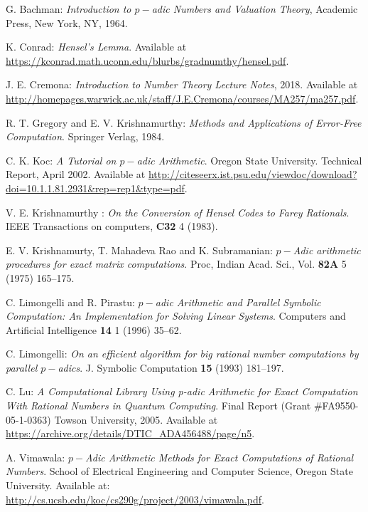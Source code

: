 \documentclass[fleqn]{cas-sc}
\begin{document}
%
\begin{thebibliography}{99}
 G. Bachman: \emph{Introduction to $p-$adic Numbers and Valuation Theory}, 
Academic Press, New York, NY, 1964.

 K. Conrad: \emph{Hensel's Lemma}. Available at
\url{https://kconrad.math.uconn.edu/blurbs/gradnumthy/hensel.pdf}.

 J. E. Cremona: \emph{Introduction to Number Theory Lecture Notes}, 2018.
Available at \url{http://homepages.warwick.ac.uk/staff/J.E.Cremona/courses/MA257/ma257.pdf}.

 R. T. Gregory and E. V. Krishnamurthy: \emph{Methods and Applications
of Error-Free Computation}. Springer Verlag, 1984.

 C. K. Koc: \emph{A Tutorial on $p-$adic Arithmetic}. Oregon State University. 
Technical Report, April 2002. Available at
\url{http://citeseerx.ist.psu.edu/viewdoc/download?doi=10.1.1.81.2931&rep=rep1&type=pdf}.

 V. E. Krishnamurthy : \emph{On the Conversion of Hensel Codes to Farey
Rationals}. IEEE Transactions on computers, \textbf{C32} 4 (1983).

 E. V. Krishnamurty, T. Mahadeva Rao and K. Subramanian: \emph{$p-$Adic
arithmetic procedures for exact matrix computations}. Proc, Indian Acad.
Sci., Vol. \textbf{82A} 5 (1975) 165--175.
 
 C. Limongelli and R. Pirastu: \emph{$p-$adic Arithmetic and Parallel Symbolic
Computation: An Implementation for Solving Linear Systems}.
Computers and Artificial Intelligence \textbf{14} 1 (1996) 35--62.

 C. Limongelli: \emph{On an efficient algorithm for big rational number
computations by parallel $p-$adics}. J. Symbolic Computation \textbf{15} (1993) 181--197.

 C. Lu: \emph{A Computational Library Using p-adic Arithmetic for Exact
Computation With Rational Numbers in Quantum Computing}. Final 
Report (Grant \#FA9550-05-1-0363) Towson University, 2005. Available at
\url{https://archive.org/details/DTIC_ADA456488/page/n5}.

 A. Vimawala: \emph{$p-$Adic Arithmetic Methods for Exact Computations
of Rational Numbers}. School of Electrical Engineering and Computer Science,
Oregon State University. Available at:
\url{http://cs.ucsb.edu/koc/cs290g/project/2003/vimawala.pdf}.


\end{thebibliography}
\end{document}
